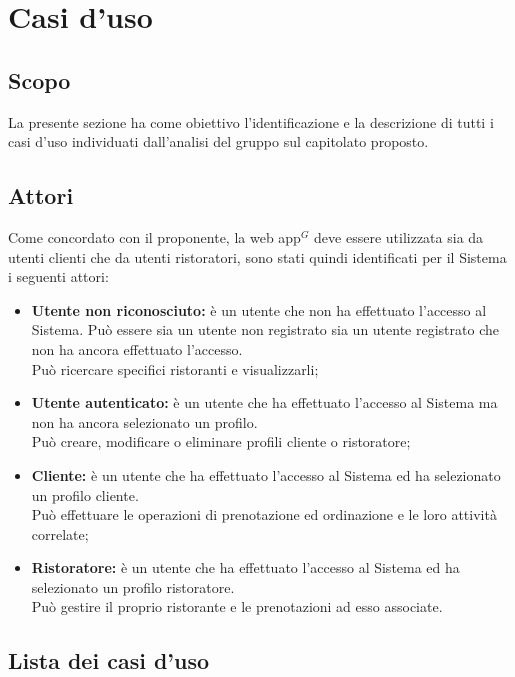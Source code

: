 \section{Casi d'uso}
\subsection{Scopo}

La presente sezione ha come obiettivo l'identificazione e la descrizione di tutti i casi d'uso individuati dall'analisi del gruppo sul capitolato proposto.

\subsection{Attori}
Come concordato con il proponente, la web app$^{G}$ deve essere utilizzata sia da utenti clienti che da utenti ristoratori, sono stati quindi identificati per il Sistema i seguenti attori:
\begin{itemize}
    \item \textbf{Utente non riconosciuto:} è un utente che non ha effettuato l'accesso al Sistema. Può essere sia un utente non registrato sia un utente registrato che non ha ancora effettuato l'accesso.\\ Può ricercare specifici ristoranti e visualizzarli;
    \item \textbf{Utente autenticato:} è un utente che ha effettuato l'accesso al Sistema ma non ha ancora selezionato un profilo.\\ Può creare, modificare o eliminare profili cliente o ristoratore;
    \item \textbf{Cliente:} è un utente che ha effettuato l'accesso al Sistema ed ha selezionato un profilo cliente.\\ Può effettuare le operazioni di prenotazione ed ordinazione e le loro attività correlate;
    \item \textbf{Ristoratore:} è un utente che ha effettuato l'accesso al Sistema ed ha selezionato un profilo ristoratore.\\ Può gestire il proprio ristorante e le prenotazioni ad esso associate.
\end{itemize}

\pagebreak
\subsection{Lista dei casi d'uso}








